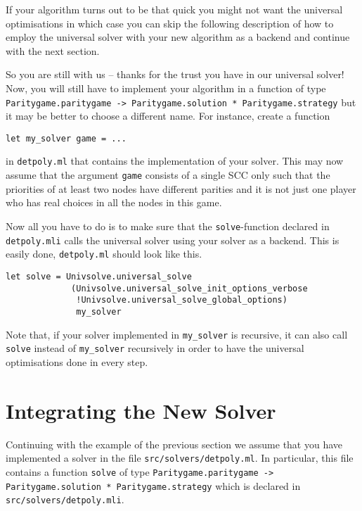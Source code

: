 If your algorithm turns out to be that quick you might not want the universal optimisations in which case you
can skip the following description of how to employ the universal solver with your new algorithm as a backend
and continue with the next section.

So you are still with us -- thanks for the trust you have in our universal solver! Now, you will still have
to implement your algorithm in a function of type
\texttt{Paritygame.paritygame -> Paritygame.solution * Paritygame.strategy} but it may be better to choose
a different name. For instance, create a function
\begin{verbatim}
let my_solver game = ...
\end{verbatim}
in \texttt{detpoly.ml} that contains the implementation of your solver. This may now assume that the argument
\texttt{game} consists of a single SCC only such that the priorities of at least two nodes have different
parities and it is not just one player who has real choices in all the nodes in this game.

Now all you have to do is to make sure that the \texttt{solve}-function declared in \texttt{detpoly.mli}
calls the universal solver using your solver as a backend. This is easily done, \texttt{detpoly.ml} should
look like this.
\begin{verbatim}
let solve = Univsolve.universal_solve
             (Univsolve.universal_solve_init_options_verbose
              !Univsolve.universal_solve_global_options)
              my_solver
\end{verbatim}
Note that, if your solver implemented in \verb#my_solver# is recursive, it can also call \verb#solve# instead
of \verb#my_solver# recursively in order to have the universal optimisations done in every step.


\section{Integrating the New Solver}

Continuing with the example of the previous section we assume that you have implemented a solver in the file
\texttt{src/solvers/detpoly.ml}. In particular, this file contains a function \texttt{solve} of type
\texttt{Paritygame.paritygame -> Paritygame.solution * Paritygame.strategy} which is declared in
\texttt{src/solvers/detpoly.mli}.

